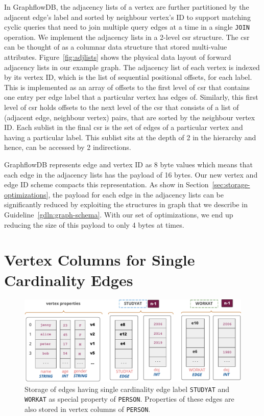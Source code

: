 In GraphflowDB, the adjacency lists of a vertex are further partitioned by the adjacent edge's label and sorted by neighbour vertex's ID to support matching cyclic queries that need to join multiple query edges at a time in a single \texttt{JOIN} operation. We implement the adjacency lists in a 2-level \gls{csr} structure. The \gls{csr} can be thought of as a columnar data structure that stored multi-value attributes. Figure~\ref{fig:adjlists} shows the physical data layout of forward adjacency lists in our example graph. The adjacency list of each vertex is indexed by its vertex ID, which is the list of sequential positional offsets, for each label. This is implemented as an array of offsets to the first level of \gls{csr} that contains one entry per edge label that a particular vertex has edges of. Similarly, this first level of \gls{csr} holds offsets to the next level of the \gls{csr} that consists of a list of (adjacent edge, neighbour vertex) pairs, that are sorted by the neighbour vertex ID. Each sublist in the final \gls{csr} is the set of edges of a particular vertex and having a particular label. This sublist sits at the depth of 2 in the hierarchy and hence, can be accessed by 2 indirections.

GraphflowDB represents edge and vertex ID as 8 byte values which means that each edge in the adjacency lists has the payload of 16 bytes. Our new vertex and edge ID scheme compacts this representation. As show in Section~\ref{sec:storage-optimizations}, the payload for each edge in the adjacency lists can be significantly reduced by exploiting the structures in graph that we describe in Guideline~\ref{gdln:graph-schema}. With our set of optimizations, we end up reducing the size of this payload to only 4 bytes at times.

\section{Vertex Columns for Single Cardinality Edges}
\label{sec:single-cardinality-cols}

\begin{figure}
	\hfill\includegraphics[scale=0.78]{img/single-cardinality-cols}\hspace*{\fill}
	\captionsetup{justification=centering}
	\caption{Storage of edges having single cardinality edge label \texttt{STUDYAT} and \texttt{WORKAT} as special property of \texttt{PERSON}. \hspace{\textwidth} Properties of these edges are also stored in vertex columns of \texttt{PERSON}.}
	\label{fig:single-cardinality-cols}
\end{figure}

